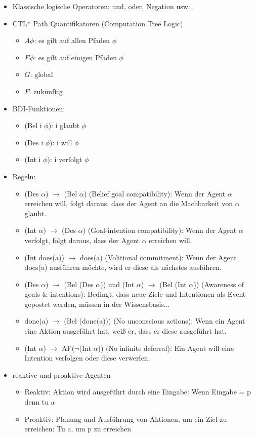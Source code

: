 \documentclass{article} %
\begin{document}
	\begin{itemize}
		\item Klassische logische Operatoren: und, oder, Negation usw...
		\item CTL* Path Quantifikatoren (Computation Tree Logic)
		\begin{itemize}
			\item $A \phi$: es gilt auf allen Pfaden $\phi$
			\item $E \phi$: es gilt auf einigen Pfaden $\phi$
			\item $G$: global
			\item $F$: zukünftig
		\end{itemize}
		\item BDI-Funktionen:
		\begin{itemize}
			\item (Bel i $\phi$): i glaubt $\phi$
			\item (Des i $\phi$): i will $\phi$
			\item (Int i $\phi$): i verfolgt $\phi$
		\end{itemize}
		\item Regeln:
		\begin{itemize}
			\item (Des $\alpha$) $\rightarrow$ (Bel $\alpha$) (Belief goal compatibility): Wenn der Agent $\alpha$ erreichen will, folgt daraus, dass der Agent an die Machbarkeit von $\alpha$ glaubt.
			\item (Int $\alpha$) $\rightarrow$ (Des $\alpha$) (Goal-intention compatibility): Wenn der Agent $\alpha$ verfolgt, folgt daraus, dass der Agent $\alpha$ erreichen will.
			\item (Int does(a)) $\rightarrow$ does(a) (Volitional commitment): Wenn der Agent does(a) ausführen möchte, wird er diese als nächstes ausführen.
			\item (Des $\alpha$) $\rightarrow$ (Bel (Des $\alpha$)) und (Int $\alpha$) $\rightarrow$ (Bel (Int $\alpha$)) (Awareness of goals \& intentions): Bedingt, dass neue Ziele und Intentionen als Event gepostet werden, müssen in der Wissensbasis...
			\item done(a) $\rightarrow$ (Bel (done(a))) (No unconscious actions): Wenn ein Agent eine Aktion ausgeführt hat, weiß er, dass er diese ausgeführt hat.
			\item (Int $\alpha$) $\rightarrow$ AF($\neg$(Int $\alpha$)) (No infinite deferral): Ein Agent will eine Intention verfolgen oder diese verwerfen.
		\end{itemize}
		\item reaktive und proaktive Agenten
		\begin{itemize}
			\item Reaktiv: Aktion wird ausgeführt durch eine Eingabe: Wenn Eingabe = p denn tu a
			\item Proaktiv: Planung und Ausführung von Aktionen, um ein Ziel zu erreichen: Tu a, um p zu erreichen
		\end{itemize}
	\end{itemize}
	
\end{document}
